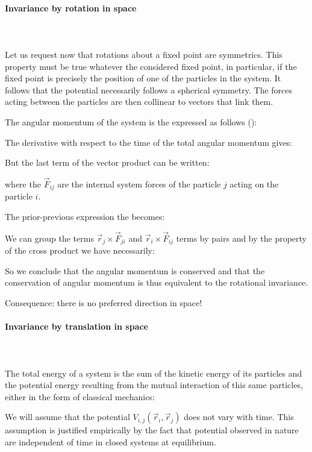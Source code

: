 	\paragraph{Invariance by rotation in space}\mbox{}\\\\
	Let us request now that rotations about a fixed point are symmetrics. This property must be true whatever the considered fixed point, in particular, if the fixed point is precisely the position of one of the particles in the system. It follows that the potential necessarily follows a spherical symmetry. The forces acting between the particles are then collinear to vectors that link them.

	The angular momentum of the system is the expressed as follows ():
	
	The derivative with respect to the time of the total angular momentum gives:

	
	But the last term of the vector product can be written:
	
	where the $\vec{F}_{ij}$ are the internal system forces of the particle $j$ acting on the particle $i$. 

	The prior-previous expression the becomes:
	
	We can group the terms $\vec{r}_j\times\vec{F}_{ji}$ and $\vec{r}_i\times\vec{F}_{ij}$ terms by pairs and by the property of the cross product we have necessarily:
	
	So we conclude that the angular momentum is conserved and that the conservation of angular momentum is thus equivalent to the rotational invariance.

	Consequence: there is no preferred direction in space!
	
	\paragraph{Invariance by translation in space}\mbox{}\\\\
	The total energy of a system is the sum of the kinetic energy of its particles and the potential energy resulting from the mutual interaction of this same particles, either in the form of classical mechanics:
	
	We will assume that the potential $V_{i,j}(\vec{r}_i,\vec{r}_j)$ does not vary with time. This assumption is justified empirically by the fact that potential observed in nature are independent of time in closed systems at equilibrium.


